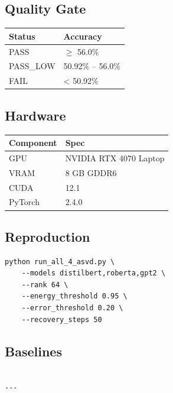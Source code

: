 \subsection{Quality Gate}

\begin{table}[H]
\centering
\small
\begin{tabular}{ll}
\toprule
\textbf{Status} & \textbf{Accuracy} \\
\midrule
PASS & $\ge$ 56.0\% \\
PASS\_LOW & 50.92\% -- 56.0\% \\
FAIL & < 50.92\% \\
\bottomrule
\end{tabular}
\end{table}

\subsection{Hardware}

\begin{table}[H]
\centering
\small
\begin{tabular}{ll}
\toprule
\textbf{Component} & \textbf{Spec} \\
\midrule
GPU & NVIDIA RTX 4070 Laptop \\
VRAM & 8 GB GDDR6 \\
CUDA & 12.1 \\
PyTorch & 2.4.0 \\
\bottomrule
\end{tabular}
\end{table}

\subsection{Reproduction}

\begin{lstlisting}
python run_all_4_asvd.py \
    --models distilbert,roberta,gpt2 \
    --rank 64 \
    --energy_threshold 0.95 \
    --error_threshold 0.20 \
    --recovery_steps 50
\end{lstlisting}

\subsection{Baselines}

\begin{lstlisting}

---
\end{lstlisting}


